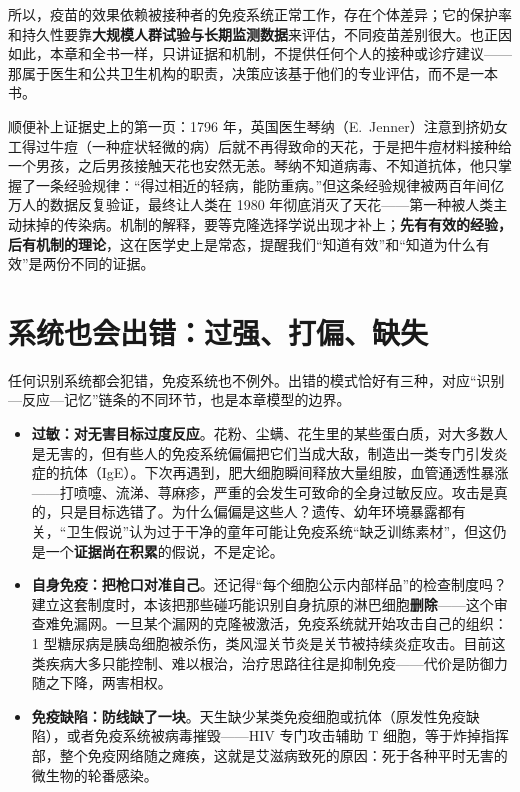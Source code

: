 所以，疫苗的效果依赖被接种者的免疫系统正常工作，存在个体差异；它的保护率和持久性要靠\textbf{大规模人群试验与长期监测数据}来评估，不同疫苗差别很大。也正因如此，本章和全书一样，只讲证据和机制，不提供任何个人的接种或诊疗建议——那属于医生和公共卫生机构的职责，决策应该基于他们的专业评估，而不是一本书。

顺便补上证据史上的第一页：1796 年，英国医生琴纳（E.~Jenner）注意到挤奶女工得过牛痘（一种症状轻微的病）后就不再得致命的天花，于是把牛痘材料接种给一个男孩，之后男孩接触天花也安然无恙。琴纳不知道病毒、不知道抗体，他只掌握了一条经验规律：“得过相近的轻病，能防重病。”但这条经验规律被两百年间亿万人的数据反复验证，最终让人类在 1980 年彻底消灭了天花——第一种被人类主动抹掉的传染病。机制的解释，要等克隆选择学说出现才补上；\textbf{先有有效的经验，后有机制的理论}，这在医学史上是常态，提醒我们“知道有效”和“知道为什么有效”是两份不同的证据。

\section{系统也会出错：过强、打偏、缺失}

任何识别系统都会犯错，免疫系统也不例外。出错的模式恰好有三种，对应“识别—反应—记忆”链条的不同环节，也是本章模型的边界。

\begin{itemize}[itemsep=2pt]
\item \textbf{过敏：对无害目标过度反应}。花粉、尘螨、花生里的某些蛋白质，对大多数人是无害的，但有些人的免疫系统偏偏把它们当成大敌，制造出一类专门引发炎症的抗体（IgE）。下次再遇到，肥大细胞瞬间释放大量组胺，血管通透性暴涨——打喷嚏、流涕、荨麻疹，严重的会发生可致命的全身过敏反应。攻击是真的，只是目标选错了。为什么偏偏是这些人？遗传、幼年环境暴露都有关，“卫生假说”认为过于干净的童年可能让免疫系统“缺乏训练素材”，但这仍是一个\textbf{证据尚在积累}的假说，不是定论。
\item \textbf{自身免疫：把枪口对准自己}。还记得“每个细胞公示内部样品”的检查制度吗？建立这套制度时，本该把那些碰巧能识别自身抗原的淋巴细胞\textbf{删除}——这个审查难免漏网。一旦某个漏网的克隆被激活，免疫系统就开始攻击自己的组织：1 型糖尿病是胰岛细胞被杀伤，类风湿关节炎是关节被持续炎症攻击。目前这类疾病大多只能控制、难以根治，治疗思路往往是抑制免疫——代价是防御力随之下降，两害相权。
\item \textbf{免疫缺陷：防线缺了一块}。天生缺少某类免疫细胞或抗体（原发性免疫缺陷），或者免疫系统被病毒摧毁——HIV 专门攻击辅助 T 细胞，等于炸掉指挥部，整个免疫网络随之瘫痪，这就是艾滋病致死的原因：死于各种平时无害的微生物的轮番感染。
\end{itemize}

